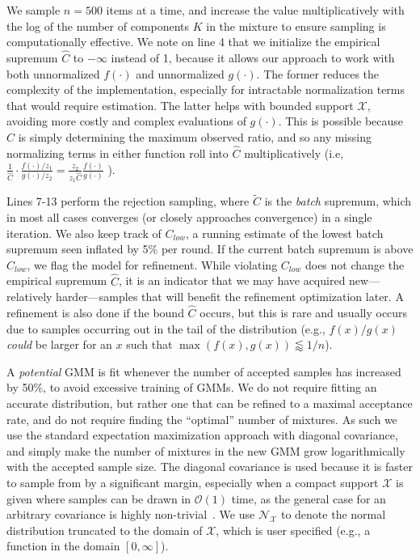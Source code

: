 \documentclass{ecai}  %
\begin{document}
We sample $n=500$ items at a time, and increase the value multiplicatively with the log of the number of components $K$ in the mixture to ensure sampling is computationally effective. We note on line 4 that we initialize the empirical supremum $\hat{C}$ to $-\infty$ instead of 1, because it allows our approach to work with both unnormalized $f(\cdot)$ and unnormalized $g(\cdot)$. The former reduces the complexity of the implementation, especially for intractable normalization terms that would require estimation. The latter helps with bounded support $\mathcal{X}$, avoiding more costly and complex evaluations of $g(\cdot)$. This is possible because $\hat{C}$ is simply determining the maximum observed ratio, and so any missing normalizing terms in either function roll into $\hat{C}$ multiplicatively (i.e, $\frac{1}{\hat{C}} \cdot \frac{f(\cdot)/z_1}{g(\cdot)/z_2} = \frac{z_2}{z_1 \hat{C}} \frac{f(\cdot)}{g(\cdot)}$ ).  

Lines 7-13 perform the rejection sampling, where $\tilde{C}$ is the \textit{batch} supremum, which in most all cases converges (or closely approaches convergence) in a single iteration.  We also keep track of $C_{\mathit{low}}$, a running estimate of the lowest batch supremum seen inflated by 5\% per round. If the current batch supremum is above $C_{\mathit{low}}$, we flag the model for refinement. While violating $C_{\mathit{low}}$ does not change the empirical supremum $\hat{C}$, it is an indicator that we may have acquired new---relatively harder---samples that will benefit the refinement optimization later.  A refinement is also done if the bound $\hat{C}$ occurs, but this is rare and usually occurs due to samples occurring out in the tail of the distribution (e.g., $f(x)/g(x)$ \textit{could} be larger for an $x$ such that $\max(f(x), g(x)) \lessapprox
1/n$). 

A \textit{potential} GMM is fit whenever the number of accepted samples has increased by 50\%, to avoid excessive training of GMMs. We do not require fitting an accurate distribution, but rather one that can be refined to a maximal acceptance rate, and do not require finding the ``optimal'' number of mixtures. As such we use the standard expectation maximization approach with diagonal covariance, and simply make the number of  mixtures in the new GMM grow logarithmically with the accepted sample size. The diagonal covariance is used because it is faster to sample from by a significant margin, especially when a compact support $\mathcal{X}$ is given where samples can be drawn in $\mathcal{O}(1)$ time, as the general case for an arbitrary covariance is highly non-trivial~\cite{Botev2017}.  We use $\mathcal{N}_\mathcal{X}$ to denote the normal distribution truncated to the domain of $\mathcal{X}$, which is user specified (e.g., a function in the domain $[0, \infty]$). 
\end{document}
